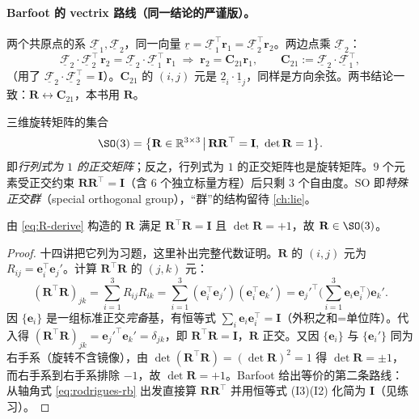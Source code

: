\paragraph{Barfoot 的 vectrix 路线（同一结论的严谨版）。}两个共原点的系 $\underline{\mathcal{F}}_1,\underline{\mathcal{F}}_2$，同一向量 $\underline{r}=\underline{\mathcal{F}}_1^\top\mathbf{r}_1=\underline{\mathcal{F}}_2^\top\mathbf{r}_2$。两边点乘 $\underline{\mathcal{F}}_2$：
\begin{equation}
  \underline{\mathcal{F}}_2\cdot\underline{\mathcal{F}}_2^\top\,\mathbf{r}_2=\underline{\mathcal{F}}_2\cdot\underline{\mathcal{F}}_1^\top\,\mathbf{r}_1
  \;\Longrightarrow\;
  \mathbf{r}_2=\mathbf{C}_{21}\mathbf{r}_1,\qquad
  \mathbf{C}_{21}:=\underline{\mathcal{F}}_2\cdot\underline{\mathcal{F}}_1^\top,
\end{equation}
（用了 $\underline{\mathcal{F}}_2\cdot\underline{\mathcal{F}}_2^\top=\mathbf{I}$）。$\mathbf{C}_{21}$ 的 $(i,j)$ 元是 $\underline{2}_i\cdot\underline{1}_j$，同样是方向余弦。两书结论一致：$\mathbf{R}\leftrightarrow\mathbf{C}_{21}$，本书用 $\mathbf{R}$。

\begin{definition}[特殊正交群 $\SO(3)$]\label{def:so3-rep}
三维旋转矩阵的集合
\begin{equation}
  \SO(3)=\big\{\mathbf{R}\in\mathbb{R}^{3\times3}\,\big|\,\mathbf{R}\mathbf{R}^\top=\mathbf{I},\ \det\mathbf{R}=1\big\}.
  \label{eq:so3-def}
\end{equation}
即\emph{行列式为 $1$ 的正交矩阵}；反之，行列式为 $1$ 的正交矩阵也是旋转矩阵。$9$ 个元素受正交约束 $\mathbf{R}\mathbf{R}^\top=\mathbf{I}$（含 $6$ 个独立标量方程）后只剩 $3$ 个自由度。$\mathrm{SO}$ 即\emph{特殊正交群}（special orthogonal group），“群”的结构留待 \cref{ch:lie}。
\end{definition}

\begin{theorem}[旋转矩阵的正交性]\label{thm:rb-orthonormal}
由 \cref{eq:R-derive} 构造的 $\mathbf{R}$ 满足 $\mathbf{R}^\top\mathbf{R}=\mathbf{I}$ 且 $\det\mathbf{R}=+1$，故 $\mathbf{R}\in\SO(3)$。
\end{theorem}
\begin{proof}
十四讲把它列为习题，这里补出完整代数证明。$\mathbf{R}$ 的 $(i,j)$ 元为 $R_{ij}=\mathbf{e}_i^\top\mathbf{e}_j'$。计算 $\mathbf{R}^\top\mathbf{R}$ 的 $(j,k)$ 元：
\[
  (\mathbf{R}^\top\mathbf{R})_{jk}=\sum_{i=1}^3 R_{ij}R_{ik}=\sum_{i=1}^3(\mathbf{e}_i^\top\mathbf{e}_j')(\mathbf{e}_i^\top\mathbf{e}_k')
  =\mathbf{e}_j'^\top\Big(\sum_{i=1}^3\mathbf{e}_i\mathbf{e}_i^\top\Big)\mathbf{e}_k'.
\]
因 $\{\mathbf{e}_i\}$ 是一组标准正交\emph{完备}基，有恒等式 $\sum_i\mathbf{e}_i\mathbf{e}_i^\top=\mathbf{I}$（外积之和=单位阵）。代入得 $(\mathbf{R}^\top\mathbf{R})_{jk}=\mathbf{e}_j'^\top\mathbf{e}_k'=\delta_{jk}$，即 $\mathbf{R}^\top\mathbf{R}=\mathbf{I}$，$\mathbf{R}$ 正交。又因 $\{\mathbf{e}_i\}$ 与 $\{\mathbf{e}_i'\}$ 同为右手系（旋转不含镜像），由 $\det(\mathbf{R}^\top\mathbf{R})=(\det\mathbf{R})^2=1$ 得 $\det\mathbf{R}=\pm1$，而右手系到右手系排除 $-1$，故 $\det\mathbf{R}=+1$。Barfoot 给出等价的第二条路线：从轴角式 \cref{eq:rodrigues-rb} 出发直接算 $\mathbf{R}\mathbf{R}^\top$ 并用恒等式 (I3)(I2) 化简为 $\mathbf{I}$（见练习）。
\end{proof}

